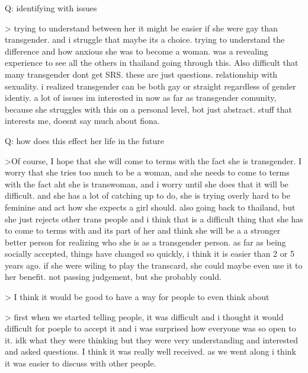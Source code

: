 Q: identifying with issues

    > trying to understand between her it might be easier if she were gay than transgender. and i struggle that maybe its a choice. trying to understand the difference and how anxious she was to become a woman. was a revealing experience to see all the others in thailand going through this. Also difficult that many transgender dont get SRS. these are just questions. relationship with sexuality. i realized transgender can be both gay or straight regardless of gender identiy. a lot of issues im interested in now as far as transgender comunity, because she struggles with this on a personal level, bot just abstract. stuff that interests me, doesnt say much about fiona.
    
Q: how does this effect her life in the future

    >Of course, I hope that she will come to terms with the fact she is transgender. I worry that she tries too much to be a woman, and she needs to come to terms with the fact aht she is transwoman, and i worry until she does that it will be difficult. and she has a lot of catching up to do, she is trying overly hard to be feminine and act how she expects a girl should. 
    also going back to thailand, but she just rejects other trans people and i think that is a difficult thing that she has to come to terms with and its part of her and think she will be a a stronger better person for realizing who she is as a transgender person. as far as being socially accepted, things have changed so quickly, i think it is easier than 2 or 5 years ago. if she were wiling to play the transcard, she could maybe even use it to her benefit. not passing judgement, but she probably could.
    
    > I think it would be good to have a way for people to even think about
    
    > first when we started telling people, it was difficult and i thought it would difficult for poeple to accept it and i was surprised how everyone was so open to it. idk what they were thinking but they were very understanding and interested and asked questions. I think it was really well received. as we went along i think it was easier to discuss with other people. 